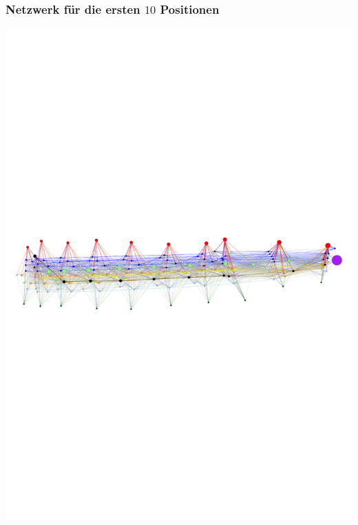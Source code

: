 \begin{frame}\frametitle{Netzwerk für die ersten $10$ Positionen}
	\centering\includegraphics[scale=.55]{netzwerk_length_10.pdf}
\end{frame}



